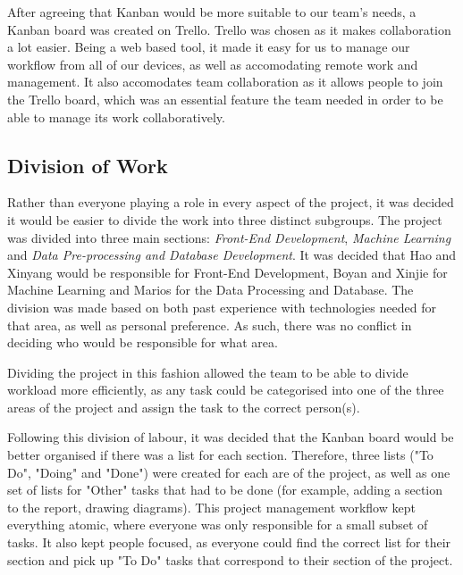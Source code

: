 \documentclass[a4paper,titlepage]{article}
\begin{document}
After agreeing that Kanban would be more suitable to our team's needs, a Kanban board was created on Trello. Trello was chosen as it makes collaboration a lot easier. 
Being a web based tool, it made it easy for us to manage our workflow from all of our devices, as well as accomodating remote work and management. 
It also accomodates team collaboration as it allows people to join the Trello board, which was an essential feature the team needed in order to be able to manage its work collaboratively.

\subsection{Division of Work\label{work_division}}
Rather than everyone playing a role in every aspect of the project, it was decided it would be easier to divide the work into three distinct subgroups. 
The project was divided into three main sections: \textit{Front-End Development}, \textit{Machine Learning} and \textit{Data Pre-processing and Database Development}. 
It was decided that Hao and Xinyang would be responsible for Front-End Development, Boyan and Xinjie for Machine Learning and Marios for the Data Processing and Database. 
The division was made based on both past experience with technologies needed for that area, as well as personal preference. 
As such, there was no conflict in deciding who would be responsible for what area.

Dividing the project in this fashion allowed the team to be able to divide workload more efficiently, as any task could be categorised into one of the three areas of the project and assign the task to the correct person(s).

Following this division of labour, it was decided that the Kanban board would be better organised if there was a list for each section. 
Therefore, three lists ("To Do", "Doing" and "Done") were created for each are of the project, as well as one set of lists for "Other" tasks that had to be done (for example, adding a section to the report, drawing diagrams). 
This project management workflow kept everything atomic, where everyone was only responsible for a small subset of tasks. 
It also kept people focused, as everyone could find the correct list for their section and pick up "To Do" tasks that correspond to their section of the project.

\pagebreak
\printbibliography
\end{document}
